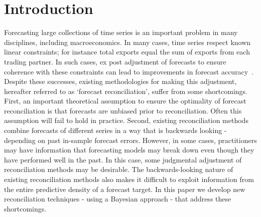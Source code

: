\documentclass[a4paper,fleqn,11pt]{article}
\begin{document}
			




\section{Introduction}
\label{sec:intro}
Forecasting large collections of time series is an important problem in many disciplines, including macroeconomics.  In many cases, time series respect known linear constraints; for instance total exports equal the sum of exports from each trading partner. In such cases, ex post adjustment of forecasts to ensure coherence with these constraints can lead to improvements in forecast accuracy~\citep[see][and references therein]{Wickramasuriya2015}. Despite these successes, existing methodologies for making this adjustment, hereafter referred to as `forecast reconciliation', suffer from some shortcomings.  First, an important theoretical assumption to ensure the optimality of forecast reconciliation is that forecasts are unbiased prior to reconciliation.  Often this assumption will fail to hold in practice.  Second, existing reconciliation methods combine forecasts of different series in a way that is backwards looking - depending on past in-sample forecast errors.  However, in some cases, practitioners may have information that forecasting models may break down even though they have performed well in the past. In this case, some judgmental adjustment of reconciliation methods may be desirable.  The backwards-looking nature of existing reconciliation methods also makes it difficult to exploit information from the entire predictive density of a forecast target.  In this paper we develop new reconciliation techniques - using a Bayesian approach - that address these shortcomings.
\end{document}

